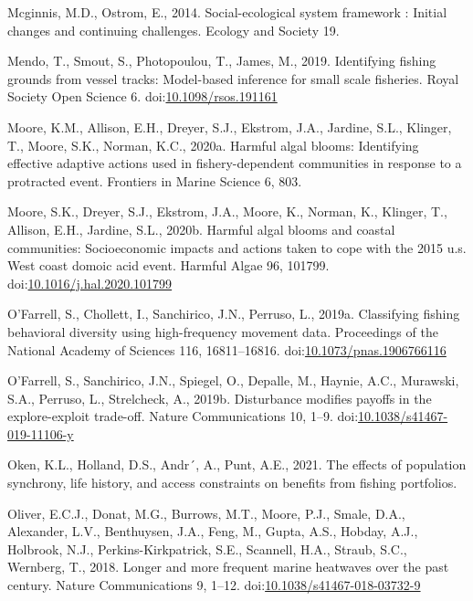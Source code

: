 \documentclass[]{elsarticle} %
\begin{document}
\leavevmode\hypertarget{ref-Mcginnis2014}{}%
Mcginnis, M.D., Ostrom, E., 2014. Social-ecological system framework :
Initial changes and continuing challenges. Ecology and Society 19.

\leavevmode\hypertarget{ref-Mendo2019}{}%
Mendo, T., Smout, S., Photopoulou, T., James, M., 2019. Identifying
fishing grounds from vessel tracks: Model-based inference for small
scale fisheries. Royal Society Open Science 6.
doi:\href{https://doi.org/10.1098/rsos.191161}{10.1098/rsos.191161}

\leavevmode\hypertarget{ref-Moore2020harmful}{}%
Moore, K.M., Allison, E.H., Dreyer, S.J., Ekstrom, J.A., Jardine, S.L.,
Klinger, T., Moore, S.K., Norman, K.C., 2020a. Harmful algal blooms:
Identifying effective adaptive actions used in fishery-dependent
communities in response to a protracted event. Frontiers in Marine
Science 6, 803.

\leavevmode\hypertarget{ref-Moore2020}{}%
Moore, S.K., Dreyer, S.J., Ekstrom, J.A., Moore, K., Norman, K.,
Klinger, T., Allison, E.H., Jardine, S.L., 2020b. Harmful algal blooms
and coastal communities: Socioeconomic impacts and actions taken to cope
with the 2015 u.s. West coast domoic acid event. Harmful Algae 96,
101799.
doi:\href{https://doi.org/10.1016/j.hal.2020.101799}{10.1016/j.hal.2020.101799}

\leavevmode\hypertarget{ref-OFarrell2019}{}%
O'Farrell, S., Chollett, I., Sanchirico, J.N., Perruso, L., 2019a.
Classifying fishing behavioral diversity using high-frequency movement
data. Proceedings of the National Academy of Sciences 116, 16811--16816.
doi:\href{https://doi.org/10.1073/pnas.1906766116}{10.1073/pnas.1906766116}

\leavevmode\hypertarget{ref-OFarrell2019a}{}%
O'Farrell, S., Sanchirico, J.N., Spiegel, O., Depalle, M., Haynie, A.C.,
Murawski, S.A., Perruso, L., Strelcheck, A., 2019b. Disturbance modifies
payoffs in the explore-exploit trade-off. Nature Communications 10,
1--9.
doi:\href{https://doi.org/10.1038/s41467-019-11106-y}{10.1038/s41467-019-11106-y}

\leavevmode\hypertarget{ref-Oken2021}{}%
Oken, K.L., Holland, D.S., Andr´, A., Punt, A.E., 2021. The effects of
population synchrony, life history, and access constraints on benefits
from fishing portfolios.

\leavevmode\hypertarget{ref-Oliver2018}{}%
Oliver, E.C.J., Donat, M.G., Burrows, M.T., Moore, P.J., Smale, D.A.,
Alexander, L.V., Benthuysen, J.A., Feng, M., Gupta, A.S., Hobday, A.J.,
Holbrook, N.J., Perkins-Kirkpatrick, S.E., Scannell, H.A., Straub, S.C.,
Wernberg, T., 2018. Longer and more frequent marine heatwaves over the
past century. Nature Communications 9, 1--12.
doi:\href{https://doi.org/10.1038/s41467-018-03732-9}{10.1038/s41467-018-03732-9}
\end{document}
